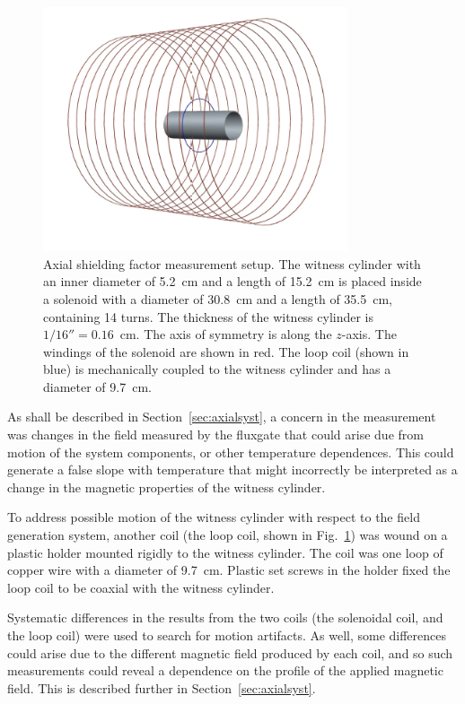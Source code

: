 \begin{figure}
  \begin{center}
    \includegraphics[width=0.8\textwidth]{geometry.PNG}
    \caption{Axial shielding factor measurement setup. The witness
      cylinder with an inner diameter of 5.2~cm and a length of
      15.2~cm is placed inside a solenoid with a diameter of 30.8~cm
      and a length of 35.5~cm, containing 14 turns.  The thickness of
      the witness cylinder is $1/16''=0.16$~cm.  The axis of symmetry
      is along the $z$-axis. The windings of the solenoid are shown in
      red. The loop coil (shown in blue) is mechanically coupled to
      the witness cylinder and has a diameter of 9.7~cm.}
    \label{fig:geometry}
  \end{center}
\end{figure}

As shall be described in Section~\ref{sec:axialsyst}, a concern in the
measurement was changes in the field measured by the fluxgate that
could arise due from motion of the system components, or other
temperature dependences.  This could generate a false slope with
temperature that might incorrectly be interpreted as a change in the
magnetic properties of the witness cylinder.

To address possible motion of the witness cylinder with respect to the
field generation system, another coil (the loop coil, shown in
Fig.~\ref{fig:geometry}) was wound on a plastic holder mounted rigidly
to the witness cylinder.  The coil was one loop of copper wire with a
diameter of 9.7~cm.  Plastic set screws in the holder fixed the loop
coil to be coaxial with the witness cylinder.

Systematic differences in the results from the two coils (the
solenoidal coil, and the loop coil) were used to search for motion
artifacts.  As well, some differences could arise due to the different
magnetic field produced by each coil, and so such measurements could
reveal a dependence on the profile of the applied magnetic field.
This is described further in Section~\ref{sec:axialsyst}.


